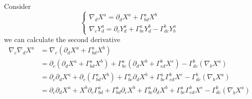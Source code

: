 
Consider
\begin{equation}
\begin{cases}
\nabla_{d}X^{a} = \partial_{d}X^{a} + \Gamma^{a}_{bd}X^{b}\\
\nabla_{c}Y^{a}_{d} = \partial_{c}Y^{a}_{d} + \Gamma^{a}_{bc}Y^{b}_{d} - \Gamma^{b}_{dc}Y^{a}_{b}
\end{cases}
\end{equation}
we can calculate the second derivative
\begin{equation}
\begin{aligned}
\nabla_{c}\nabla_{d} X^{a}
&= \nabla_{c} \left(\partial_{d}X^{a} + \Gamma^{a}_{bd}X^{b}\right)\\
&= \partial_{c}\left(\partial_{d}X^{a} + \Gamma^{a}_{bd}X^{b}\right)
+ \Gamma^{a}_{bc}\left(\partial_{d}X^{b} + \Gamma^{b}_{ed}X^{e}\right) - \Gamma^{b}_{dc} \left(\nabla_{b}X^{a}\right)\\
&= \partial_{c}\partial_{d}X^{a} + \partial_{c}\left(\Gamma^{a}_{bd}X^{b}\right)
+ \Gamma^{a}_{bc}\partial_{d}X^{b} + \Gamma^{a}_{bc}\Gamma^{b}_{ed}X^{e} - \Gamma^{b}_{dc} \left(\nabla_{b}X^{a}\right)\\
&= \partial_{c}\partial_{d}X^{a}
+ X^{b}\partial_{c}\Gamma^{a}_{bd} + \Gamma^{a}_{bd}\partial_{c}X^{b}
+ \Gamma^{a}_{bc}\partial_{d}X^{b} + \Gamma^{a}_{bc}\Gamma^{b}_{ed}X^{e} - \Gamma^{b}_{dc} \left(\nabla_{b}X^{a}\right)\\
\end{aligned}
\end{equation}


